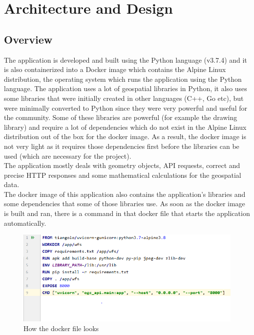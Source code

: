 \chapter{Architecture and Design}
\section{Overview}
The application is developed and built using the Python language (v3.7.4) and it is also containerized into a Docker image which contains the Alpine Linux distribution, the operating system which runs the application using the Python language. 
The application uses a lot of geospatial libraries in Python, it also uses some libraries that were initially created in other languages (C++, Go etc), but were minimally converted to Python since they were very powerful and useful for the community.
Some of these libraries are powerful (for example the drawing library) and require a lot of dependencies which do not exist in the Alpine Linux distribution out of the box for the docker image. As a result, the docker image is not very light as it requires those dependencies first before the libraries can be used (which are necessary for the project).\\
The application mostly deals with geometry objects, API requests, correct and precise HTTP responses and some mathematical calculations for the geospatial data.\\
\newline
The docker image of this application also contains the application's libraries and some dependencies that some of those libraries use.
As soon as the docker image is built and ran, there is a command in that docker file that starts the application automatically.
\newline
\begin{figure}[H]
	\includegraphics[width=\linewidth]{./Images/ArchitectureDesign/dockerfile_image.png}
	\caption{How the docker file looks}
\end{figure}

